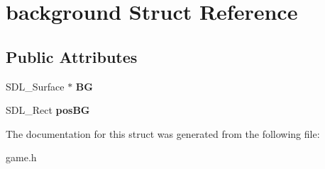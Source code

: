 \hypertarget{structbackground}{}\section{background Struct Reference}
\label{structbackground}
\subsection*{Public Attributes}
\begin{DoxyCompactItemize}
\item 
\mbox{\label{structbackground_a2ec25e9f05c19b822e472f74f6bbc872}} 
S\+D\+L\+\_\+\+Surface $\ast$ {\bfseries BG}
\item 
\mbox{\label{structbackground_ab0f84b3bb28552a073784481ba055555}} 
S\+D\+L\+\_\+\+Rect {\bfseries pos\+BG}
\end{DoxyCompactItemize}


The documentation for this struct was generated from the following file\+:\begin{DoxyCompactItemize}
\item 
game.\+h\end{DoxyCompactItemize}
